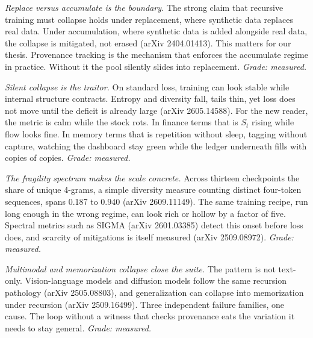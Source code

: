 \textit{Replace versus accumulate is the boundary.} The strong claim that recursive training must collapse holds under replacement, where synthetic data replaces real data. Under accumulation, where synthetic data is added alongside real data, the collapse is mitigated, not erased (arXiv 2404.01413). This matters for our thesis. Provenance tracking is the mechanism that enforces the accumulate regime in practice. Without it the pool silently slides into replacement. \textit{Grade: measured.}

\textit{Silent collapse is the traitor.} On standard loss, training can look stable while internal structure contracts. Entropy and diversity fall, tails thin, yet loss does not move until the deficit is already large (arXiv 2605.14588). For the new reader, the metric is calm while the stock rots. In finance terms that is $S_t$ rising while flow looks fine. In memory terms that is repetition without sleep, tagging without capture, watching the dashboard stay green while the ledger underneath fills with copies of copies. \textit{Grade: measured.}

\textit{The fragility spectrum makes the scale concrete.} Across thirteen checkpoints the share of unique 4-grams, a simple diversity measure counting distinct four-token sequences, spans 0.187 to 0.940 (arXiv 2609.11149). The same training recipe, run long enough in the wrong regime, can look rich or hollow by a factor of five. Spectral metrics such as SIGMA (arXiv 2601.03385) detect this onset before loss does, and scarcity of mitigations is itself measured (arXiv 2509.08972). \textit{Grade: measured.}

\textit{Multimodal and memorization collapse close the suite.} The pattern is not text-only. Vision-language models and diffusion models follow the same recursion pathology (arXiv 2505.08803), and generalization can collapse into memorization under recursion (arXiv 2509.16499). Three independent failure families, one cause. The loop without a witness that checks provenance eats the variation it needs to stay general. \textit{Grade: measured.}

